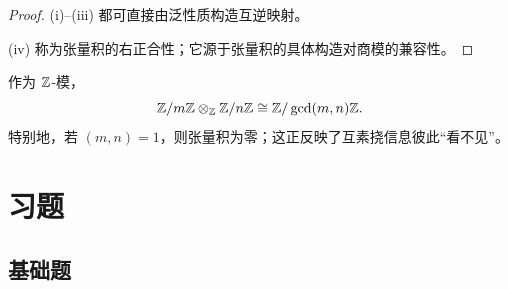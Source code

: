 \begin{proof}
(i)--(iii) 都可直接由泛性质构造互逆映射。

(iv) 称为张量积的右正合性；它源于张量积的具体构造对商模的兼容性。
\end{proof}

\begin{example}
作为 $\mathbb{Z}$-模，
\[
 \mathbb{Z}/m\mathbb{Z}\otimes_{\mathbb{Z}} \mathbb{Z}/n\mathbb{Z}\cong \mathbb{Z}/\gcd(m,n)\mathbb{Z}.
\]
特别地，若 $(m,n)=1$，则张量积为零；这正反映了互素挠信息彼此“看不见”。
\end{example}

\section*{习题}

\subsection*{基础题}
